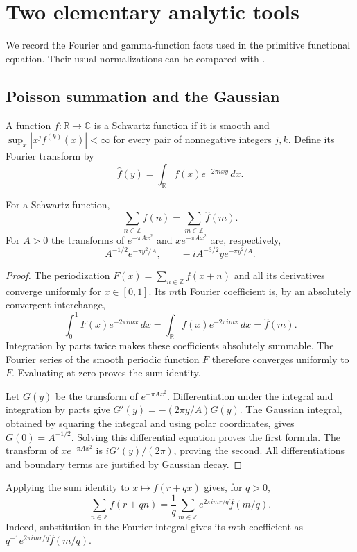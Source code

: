 \section{Two elementary analytic tools}
\label{sec:analytic-tools}

We record the Fourier and gamma-function facts used in the primitive
functional equation. Their usual normalizations can be compared with
\cite[\S\S1.8(iv), 5.2]{DLMF}.

\subsection{Poisson summation and the Gaussian}

A function $f:\mathbb R\to\mathbb C$ is a Schwartz function if it is
smooth and $\sup_x |x^j f^{(k)}(x)|<\infty$ for every pair of
nonnegative integers $j,k$. Define its Fourier transform by
\[
 \widehat f(y)=\int_{\mathbb R}f(x)e^{-2\pi ixy}\,dx.
\]
\begin{lemma}\label{tools:poisson}
For a Schwartz function,
\[
 \sum_{n\in\mathbb Z}f(n)=\sum_{m\in\mathbb Z}\widehat f(m).
\]
For $A>0$ the transforms of $e^{-\pi Ax^2}$ and
$xe^{-\pi Ax^2}$ are, respectively,
\[
 A^{-1/2}e^{-\pi y^2/A},\qquad
 -iA^{-3/2}y e^{-\pi y^2/A}.
\]
\end{lemma}
\begin{proof}
The periodization $F(x)=\sum_{n\in\mathbb Z}f(x+n)$ and all its
derivatives converge uniformly for $x\in[0,1]$. Its $m$th Fourier
coefficient is, by an absolutely convergent interchange,
\[
 \int_0^1F(x)e^{-2\pi imx}\,dx
  =\int_{\mathbb R}f(x)e^{-2\pi imx}\,dx=\widehat f(m).
\]
Integration by parts twice makes these coefficients absolutely summable.
The Fourier series of the smooth periodic function $F$ therefore
converges uniformly to $F$. Evaluating at zero proves the sum identity.

Let $G(y)$ be the transform of $e^{-\pi Ax^2}$. Differentiation under
the integral and integration by parts give
$G'(y)=-(2\pi y/A)G(y)$. The Gaussian integral, obtained by squaring
the integral and using polar coordinates, gives $G(0)=A^{-1/2}$.
Solving this differential equation proves the first formula. The transform
of $xe^{-\pi Ax^2}$ is $iG'(y)/(2\pi)$, proving the second.
All differentiations and boundary terms are justified by Gaussian decay.
\end{proof}

Applying the sum identity to $x\mapsto f(r+qx)$ gives, for $q>0$,
\begin{equation}\label{tools:poisson-progression}
 \sum_{n\in\mathbb Z}f(r+qn)
 =\frac1q\sum_{m\in\mathbb Z}
          e^{2\pi imr/q}\widehat f(m/q).
\end{equation}
Indeed, substitution in the Fourier integral gives its $m$th
coefficient as $q^{-1}e^{2\pi imr/q}\widehat f(m/q)$.

